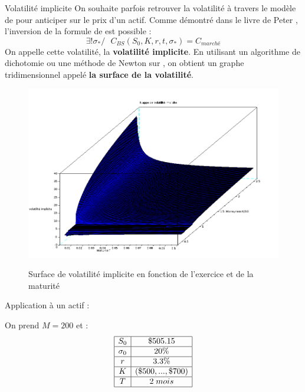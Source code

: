\documentclass[final]{beamer}
\newlength{\onecolwid}
\begin{document}
\begin{frame}[t]
\begin{columns}[t]
\begin{column}{\onecolwid}
\begin{block}{Volatilité implicite}
On souhaite parfois retrouver la volatilité à travers le modèle de  pour anticiper sur le prix d'un actif. \newline
Comme démontré dans le livre de Peter , l'inversion de la formule de  est possible :
  $$ \exists ! \sigma_* / \ \ \ C_{BS}(S_0,K,r,t,\sigma_*) = C_{marché} $$
  On appelle cette volatilité, la \textbf{volatilité implicite}.
\newline
  En utilisant un algorithme de dichotomie ou une méthode de Newton sur , on obtient un graphe tridimensionnel appelé \textbf{la surface de la volatilité}.
    \begin{figure}
      \includegraphics[scale=0.80]{volimpl1.png}
      \label{volimpl1}
      \caption{Surface de volatilité implicite en fonction de l'exercice et de la maturité}
      \label{Exemple de surface de volatilité}
    \end{figure}
\end{block}
\vspace{-1cm}
\begin{block}{Application à un actif :}
  \begin{minipage}{0.49\textwidth}
    On prend $M = 200$ et :
      \[
        \begin{array}{|c|c|}
          \hline
          S_0 & \$ 505.15  \\ \hline
          \sigma_0 & 20\% \\ \hline
          r & 3.3 \% \\ \hline
          K & (\$500,...,\$700) \\ \hline
          T & 2 \;mois \\ \hline
        \end{array}
      \]
  \end{minipage}


\end{block}
\end{column}
\end{columns}
\end{frame}
\end{document}

